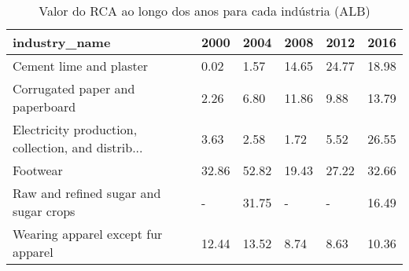 \begin{table}
\centering
\caption{Valor do RCA ao longo dos anos para cada indústria (ALB)}
\begin{tabular}{p{6cm}p{1.5cm}p{1.5cm}p{1.5cm}p{1.5cm}p{1.5cm}}
\toprule
                                     industry\_name &  2000 &  2004 &  2008 &  2012 &  2016 \\
\midrule
                           Cement lime and plaster &  0.02 &  1.57 & 14.65 & 24.77 & 18.98 \\
                   Corrugated paper and paperboard &  2.26 &  6.80 & 11.86 &  9.88 & 13.79 \\
Electricity production, collection, and distrib... &  3.63 &  2.58 &  1.72 &  5.52 & 26.55 \\
                                          Footwear & 32.86 & 52.82 & 19.43 & 27.22 & 32.66 \\
             Raw and refined sugar and sugar crops &     - & 31.75 &     - &     - & 16.49 \\
                Wearing apparel except fur apparel & 12.44 & 13.52 &  8.74 &  8.63 & 10.36 \\
\bottomrule
\end{tabular}
\end{table}
